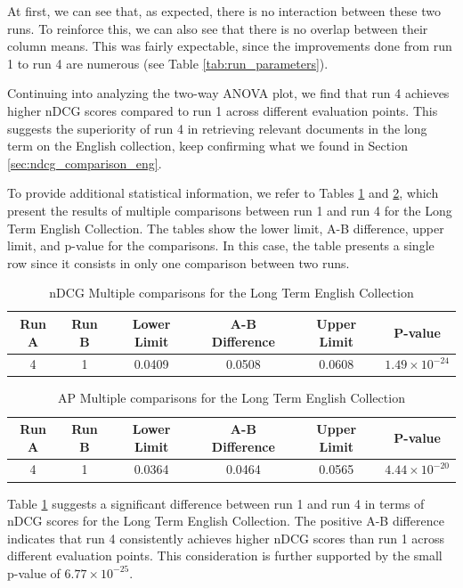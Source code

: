 At first, we can see that, as expected, there is no interaction between these two runs. To reinforce this, we can also see that there is no overlap between their column means.
This was fairly expectable, since the improvements done from run 1 to run 4 are numerous (see Table \ref{tab:run_parameters}).

Continuing into analyzing the two-way \ac{ANOVA} plot, we find that run 4 achieves higher \ac{nDCG} scores compared to run 1 across different evaluation points.
This suggests the superiority of run 4 in retrieving relevant documents in the long term on the English collection, keep confirming what we found in Section \ref{sec:ndcg_comparison_eng}.

To provide additional statistical information, we refer to Tables \ref{table:lt_anova_eng} and \ref{table:lt_anova_eng_ap}, which present the results of multiple comparisons between run 1 and run 4 for the Long Term English Collection.
The tables show the lower limit, A-B difference, upper limit, and p-value for the comparisons.
In this case, the table presents a single row since it consists in only one comparison between two runs.

\begin{table}[!h]
    \centering
    \caption{\ac{nDCG} Multiple comparisons for the Long Term English Collection}
    \label{table:lt_anova_eng}
    \begin{tabular}{cccccc}
    \hline
    Run A & Run B & Lower Limit & A-B Difference & Upper Limit & P-value \\
    \hline
    4 & 1 & 0.0409 & 0.0508 & 0.0608 & $1.49 \times 10^{-24}$ \\
    \hline
    \end{tabular}
\end{table}

\begin{table}[!h]
    \centering
    \caption{\ac{AP} Multiple comparisons for the Long Term English Collection}
    \label{table:lt_anova_eng_ap}
    \begin{tabular}{cccccc}
    \hline
    Run A & Run B & Lower Limit & A-B Difference & Upper Limit & P-value \\
    \hline
    4 & 1 & 0.0364 & 0.0464 & 0.0565 & $4.44 \times 10^{-20}$ \\
    \hline
    \end{tabular}
\end{table}

Table \ref{table:lt_anova_eng} suggests a significant difference between run 1 and run 4 in terms of \ac{nDCG} scores for the Long Term English Collection.
The positive A-B difference indicates that run 4 consistently achieves higher \ac{nDCG} scores than run 1 across different evaluation points. This consideration is further supported by the small p-value of $6.77 \times 10^{-25}$.

